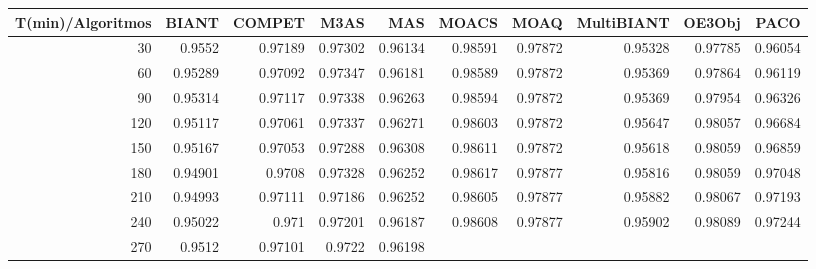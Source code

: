 \begin{table}[h]
    \centering
    \begin{tabular}{|r|r|r|r|r|r|r|r|r|r|}
        \hline \tiny T(min)/Algoritmos & \tiny {BIANT} & \tiny {COMPET} & \tiny {M3AS} & \tiny
        {MAS} & \tiny {MOACS} & \tiny {MOAQ} & \tiny {MultiBIANT} & \tiny {OE3Obj} & \tiny {PACO} \\
        \hline \tiny 30 &{\tiny 0.9552}    &{\tiny 0.97189}    &{\tiny 0.97302}    &{\tiny 0.96134}
        &{\tiny 0.98591}    &{\tiny 0.97872}    &{\tiny 0.95328}    &{\tiny 0.97785}    &{\tiny 0.96054} \\
        \hline \tiny 60 &{\tiny 0.95289}    &{\tiny 0.97092}    &{\tiny 0.97347}    &{\tiny
        0.96181}    &{\tiny 0.98589}    &{\tiny 0.97872}    &{\tiny 0.95369}    &{\tiny 0.97864}
        &{\tiny 0.96119} \\
        \hline \tiny 90 &{\tiny 0.95314}    &{\tiny 0.97117}    &{\tiny 0.97338}    &{\tiny
        0.96263}    &{\tiny 0.98594}    &{\tiny 0.97872}    &{\tiny 0.95369}    &{\tiny 0.97954}
        &{\tiny 0.96326} \\
        \hline \tiny 120 &{\tiny 0.95117}    &{\tiny 0.97061}    &{\tiny 0.97337}    &{\tiny
        0.96271}    &{\tiny 0.98603}    &{\tiny 0.97872}    &{\tiny 0.95647}    &{\tiny 0.98057}
        &{\tiny 0.96684} \\
        \hline \tiny 150 &{\tiny 0.95167}    &{\tiny 0.97053}    &{\tiny 0.97288}    &{\tiny
        0.96308}    &{\tiny 0.98611}    &{\tiny 0.97872}    &{\tiny 0.95618}    &{\tiny 0.98059}
        &{\tiny 0.96859} \\
        \hline \tiny 180 &{\tiny 0.94901}    &{\tiny 0.9708}    &{\tiny 0.97328}    &{\tiny
        0.96252}    &{\tiny 0.98617}    &{\tiny 0.97877}    &{\tiny 0.95816}    &{\tiny 0.98059}
        &{\tiny 0.97048} \\
        \hline \tiny 210 &{\tiny 0.94993}    &{\tiny 0.97111}    &{\tiny 0.97186}    &{\tiny
        0.96252}    &{\tiny 0.98605}    &{\tiny 0.97877}    &{\tiny 0.95882}    &{\tiny 0.98067}
        &{\tiny 0.97193} \\
        \hline \tiny 240 &{\tiny 0.95022}    &{\tiny 0.971}    &{\tiny 0.97201}    &{\tiny 0.96187}
        &{\tiny 0.98608}    &{\tiny 0.97877}    &{\tiny 0.95902}    &{\tiny 0.98089}    &{\tiny 0.97244} \\
        \hline \tiny 270 &{\tiny 0.9512}    &{\tiny 0.97101}    &{\tiny 0.9722}    &{\tiny 0.96198}

\end{tabular}
\end{table}
